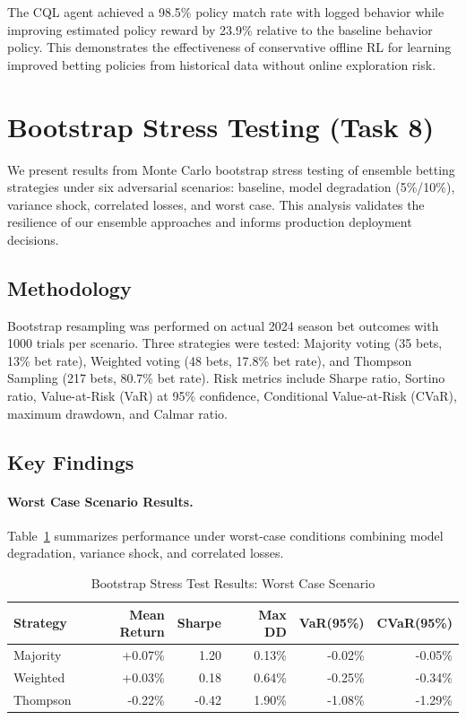 \documentclass[12pt]{report}  %
\numberwithin{equation}{section}
\theoremstyle{plain}
\theoremstyle{definition}
\theoremstyle{remark}
\begin{document}
The CQL agent achieved a 98.5\% policy match rate with logged behavior while improving estimated policy reward by 23.9\% relative to the baseline behavior policy. This demonstrates the effectiveness of conservative offline RL for learning improved betting policies from historical data without online exploration risk.

\section{Bootstrap Stress Testing (Task 8)}
We present results from Monte Carlo bootstrap stress testing of ensemble betting strategies under six adversarial scenarios: baseline, model degradation (5\%/10\%), variance shock, correlated losses, and worst case. This analysis validates the resilience of our ensemble approaches and informs production deployment decisions.

\subsection{Methodology}
Bootstrap resampling was performed on actual 2024 season bet outcomes with 1000 trials per scenario. Three strategies were tested: Majority voting (35 bets, 13\% bet rate), Weighted voting (48 bets, 17.8\% bet rate), and Thompson Sampling (217 bets, 80.7\% bet rate). Risk metrics include Sharpe ratio, Sortino ratio, Value-at-Risk (VaR) at 95\% confidence, Conditional Value-at-Risk (CVaR), maximum drawdown, and Calmar ratio.

\subsection{Key Findings}

\paragraph{Worst Case Scenario Results.}
Table~\ref{tab:bootstrap-worst-case} summarizes performance under worst-case conditions combining model degradation, variance shock, and correlated losses.

\begin{table}[htbp]
\centering
\caption{Bootstrap Stress Test Results: Worst Case Scenario}
\label{tab:bootstrap-worst-case}
\begin{tabular}{@{} l r r r r r @{}}
\toprule
Strategy & Mean Return & Sharpe & Max DD & VaR(95\%) & CVaR(95\%) \\
\midrule
Majority & +0.07\% & 1.20 & 0.13\% & -0.02\% & -0.05\% \\
Weighted & +0.03\% & 0.18 & 0.64\% & -0.25\% & -0.34\% \\
Thompson & -0.22\% & -0.42 & 1.90\% & -1.08\% & -1.29\% \\
\bottomrule
\end{tabular}
\end{table}
\end{document}
